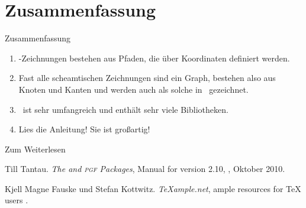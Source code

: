 \section*{Zusammenfassung}

\begin{frame}{Zusammenfassung}
  \begin{enumerate}
    \item \TikZ-Zeichnungen bestehen aus \alert{Pfaden}, die über \alert{Koordinaten} definiert werden.
    \item Fast alle scheamtischen Zeichnungen sind ein \alert{Graph}, bestehen also aus \alert{Knoten} und \alert{Kanten} und
      werden auch als solche in \TikZ\ gezeichnet.
    \item \TikZ\ ist sehr umfangreich und enthält \alert{sehr viele Bibliotheken}.
    \item \alert{Lies die Anleitung! Sie ist großartig!}
  \end{enumerate}
\end{frame}

\begin{Frame}{Zum Weiterlesen}
  \begin{mybib}
      Till Tantau.
      \newblock \emph{The \TikZ and \textsc{pgf} Packages},
      \newblock Manual for version 2.10,
      \newblock {}, Oktober 2010.

      Kjell Magne Fauske und Stefan Kottwitz.
      \newblock \emph{\TeX ample.net},
      \newblock ample resources for TeX users
      \newblock {}.
  \end{mybib}
\end{Frame}
